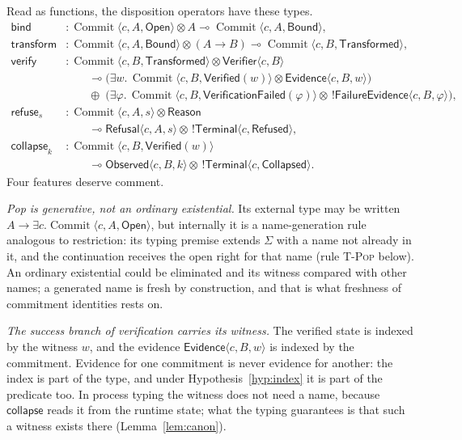 \documentclass[11pt,openany]{book}
\theoremstyle{remark}
\newcommand{\Commit}{\operatorname{Commit}}
\begin{document}
Read as functions, the disposition operators have these types.
\[
\begin{aligned}
\mathsf{bind}&:\Commit\langle c,A,\mathsf{Open}\rangle\otimes A
\multimap\Commit\langle c,A,\mathsf{Bound}\rangle,\\
\mathsf{transform}&:\Commit\langle c,A,\mathsf{Bound}\rangle
\otimes(A\to B)
\multimap\Commit\langle c,B,\mathsf{Transformed}\rangle,\\
\mathsf{verify}&:\Commit\langle c,B,\mathsf{Transformed}\rangle
\otimes\mathsf{Verifier}\langle c,B\rangle\\
&\qquad\multimap
\bigl(\exists w.\,\Commit\langle c,B,\mathsf{Verified}(w)\rangle
\otimes\mathsf{Evidence}\langle c,B,w\rangle\bigr)\\
&\qquad\oplus\;
\bigl(\exists\varphi.\,\Commit\langle c,B,\mathsf{VerificationFailed}(\varphi)\rangle
\otimes\,!\mathsf{FailureEvidence}\langle c,B,\varphi\rangle\bigr),\\
\mathsf{refuse}_s&:\Commit\langle c,A,s\rangle\otimes\mathsf{Reason}\\
&\qquad\multimap\mathsf{Refusal}\langle c,A,s\rangle
\otimes\,!\mathsf{Terminal}\langle c,\mathsf{Refused}\rangle,\\
\mathsf{collapse}_k&:\Commit\langle c,B,\mathsf{Verified}(w)\rangle\\
&\qquad\multimap\mathsf{Observed}\langle c,B,k\rangle
\otimes\,!\mathsf{Terminal}\langle c,\mathsf{Collapsed}\rangle.
\end{aligned}
\]
Four features deserve comment.

\emph{Pop is generative, not an ordinary existential.} Its external type
may be written $A\to\exists c.\Commit\langle c,A,\mathsf{Open}\rangle$,
but internally it is a name-generation rule analogous to restriction: its
typing premise extends $\Sigma$ with a name not already in it, and the
continuation receives the open right for that name (rule \textsc{T-Pop}
below). An ordinary existential could be eliminated and its witness
compared with other names; a generated name is fresh by construction, and
that is what freshness of commitment identities rests on.

\emph{The success branch of verification carries its witness.} The
verified state is indexed by the witness $w$, and the evidence
$\mathsf{Evidence}\langle c,B,w\rangle$ is indexed by the commitment.
Evidence for one commitment is never evidence for another: the index is
part of the type, and under Hypothesis~\ref{hyp:index} it is part of the
predicate too. In process typing the witness does not need a name, because
$\mathsf{collapse}$ reads it from the runtime state; what the typing
guarantees is that such a witness exists there (Lemma~\ref{lem:canon}).
\end{document}
